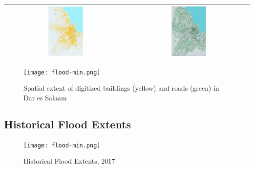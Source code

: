 \documentclass[a4paper,12pt,twoside]{article}
\begin{document}
\begin{center}
\begin{tabular}{|c@{}c|}
	\hline
	\includegraphics[width=0.3\textwidth]{images/overview_buildings.JPG}&%
	\includegraphics[width=0.3\textwidth]{images/overview_highway.JPG}\\
	\hline
\end{tabular}
\end{center}
\begin{figure}[h]
    \centering
    \texttt{[image: flood-min.png]}
    \caption{Spatial extent of digitized buildings (yellow) and roads (green) in Dar es Salaam}
\end{figure}

\newpage
\subsection{Historical Flood Extents}
\begin{figure}[h]
    \centering
    \texttt{[image: flood-min.png]}
    \caption{Historical Flood Extents, 2017}
\end{figure}
\end{document}
